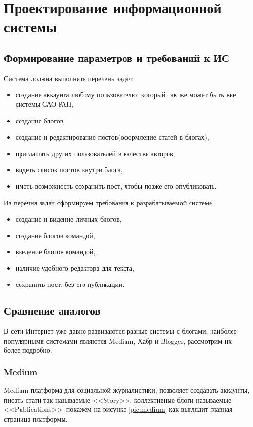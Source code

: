 \section{Проектирование информационной системы}

\subsection{Формирование параметров и требований к ИС}
Система должна выполнять перечень задач:
\begin{itemize}
	\item создание аккаунта любому пользователю, который так же может быть вне системы САО РАН, 
	\item создание блогов,
	\item создание и редактирование постов(оформление статей в блогах),
	\item приглашать других пользователей в качестве авторов,
	\item видеть список постов внутри блога,
	\item иметь возможность сохранить пост, чтобы позже его опубликовать. 
\end{itemize}

Из перечня задач сформируем требования к разрабатываемой системе:
\begin{itemize}
	\item создание и видение личных блогов,
	\item создание блогов командой,
	\item введение блогов командой,
	\item наличие удобного редактора для текста,
	\item сохранить пост, без его публикации. 
\end{itemize}

\subsection{Сравнение аналогов}
В сети Интернет уже давно развиваются разные системы с блогами, наиболее популярными системами являются Medium, Хабр и Blogger, рассмотрим их более подробно.

\pagebreak
\subsubsection{Medium}
Medium платформа для социальной журналистики, позволяет создавать аккаунты, писать стати так называемые <<Story>>, коллективные блоги называемые <<Publications>>, покажем на рисунке \ref{pic:medium} как выглядит главная страница платформы.

